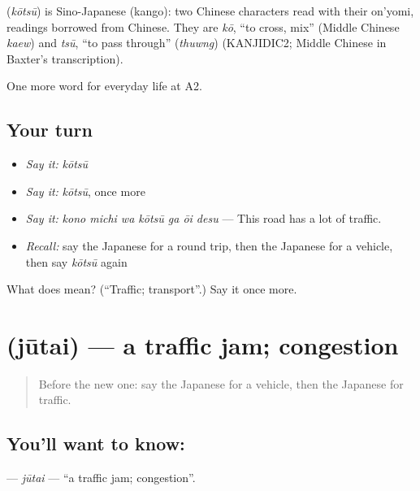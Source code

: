 \begin{cousinweb}
\textbf{} (\emph{kōtsū}) is Sino-Japanese (kango): two Chinese characters read with their on'yomi, readings borrowed from Chinese. They are \emph{kō}, \textquotedblleft{}to cross, mix\textquotedblright{} (Middle Chinese \emph{kaew}) and \emph{tsū}, \textquotedblleft{}to pass through\textquotedblright{} (\emph{thuwng}) (KANJIDIC2; Middle Chinese in Baxter's transcription).
\end{cousinweb}

\begin{grammarlens}[title={What you've built}]
One more word for everyday life at A2.
\end{grammarlens}

\subsection*{Your turn}
\begin{itemize}
\raggedright
  \item \emph{Say it:} \emph{kōtsū}
  \item \emph{Say it:} \emph{kōtsū}, once more
  \item \emph{Say it:} \emph{kono michi wa kōtsū ga ōi desu} — This road has a lot of traffic.
  \item \emph{Recall:} say the Japanese for a round trip, then the Japanese for a vehicle, then say \emph{kōtsū} again
\end{itemize}

\begin{tcolorbox}[breakable,colback=teal!4,colframe=teal!35!black,title={Before you move on}]
What does  mean? (\textquotedblleft{}Traffic; transport\textquotedblright{}.) Say it once more.
\end{tcolorbox}
\section[\texorpdfstring{\ja{じゅうたい} (jūtai)}{じゅうたい (jūtai)}]{ (jūtai) — a traffic jam; congestion}

\label{lesson:JA-C206-juutai}



\begin{quote}
Before the new one: say the Japanese for a vehicle, then the Japanese for traffic.
\end{quote}

\subsection*{You'll want to know: }
\textbf{} — \emph{jūtai} — \textquotedblleft{}a traffic jam; congestion\textquotedblright{}.

